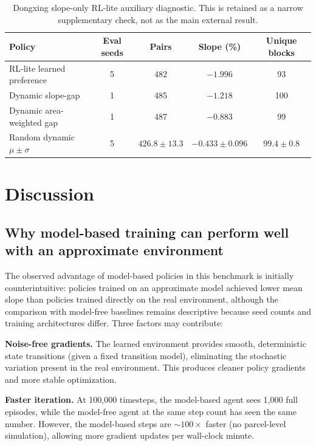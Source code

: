 \documentclass[11pt]{article}
\begin{document}
\begin{table}[htbp]
\centering
\scriptsize
\setlength{\tabcolsep}{3pt}
\caption{Dongxing slope-only RL-lite auxiliary diagnostic. This is retained as a narrow supplementary check, not as the main external result.}
\label{tab:dongxing_rl_lite}
\begin{tabular}{lcccc}
\toprule
Policy & Eval seeds & Pairs & Slope (\%) & Unique blocks \\
\midrule
RL-lite learned preference & 5 & 482 & $\mathbf{-1.996}$ & 93 \\
Dynamic slope-gap & 1 & 485 & $-1.218$ & 100 \\
Dynamic area-weighted gap & 1 & 487 & $-0.883$ & 99 \\
Random dynamic $\mu \pm \sigma$ & 5 & $426.8 \pm 13.3$ & $-0.433 \pm 0.096$ & $99.4 \pm 0.8$ \\
\bottomrule
\end{tabular}
\end{table}


\section{Discussion}
\label{sec:discussion}

\subsection{Why model-based training can perform well with an approximate environment}

The observed advantage of model-based policies in this benchmark is initially counterintuitive: policies trained on an approximate model achieved lower mean slope than policies trained directly on the real environment, although the comparison with model-free baselines remains descriptive because seed counts and training architectures differ. Three factors may contribute:

\textbf{Noise-free gradients.} The learned environment provides smooth, deterministic state transitions (given a fixed transition model), eliminating the stochastic variation present in the real environment. This produces cleaner policy gradients and more stable optimization.

\textbf{Faster iteration.} At 100{,}000 timesteps, the model-based agent sees 1{,}000 full episodes, while the model-free agent at the same step count has seen the same number. However, the model-based steps are $\sim$$100\times$ faster (no parcel-level simulation), allowing more gradient updates per wall-clock minute.
\end{document}
